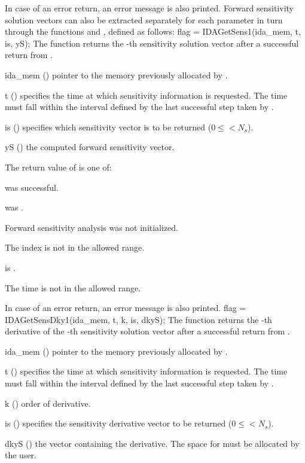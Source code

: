 {
  In case of an error return, an error message is also printed.  
}
Forward sensitivity solution vectors can also be extracted separately for 
each parameter in turn through the functions  and
, defined as follows:
{
  flag = IDAGetSens1(ida\_mem, t, is, yS);
}
{
  The function  returns the -th sensitivity solution vector
  after a successful return from .
}
{
  \begin{args}
  \item[ida\_mem] ()
    pointer to the memory previously allocated by .
  \item[t] ()
    specifies the time at which sensitivity information is 
    requested. The time  must fall within the interval defined by the last 
    successful step taken by {\idas}.
  \item[is] () specifies which sensitivity vector is to be returned
    ($0\le$$< N_s$).
  \item[yS] ()
    the computed forward sensitivity vector.
  \end{args}
}
{
  The return value  of  is one of:
  \begin{args}
  \item[\Id{IDA\_SUCCESS}]
     was successful.
  \item[\Id{IDA\_MEM\_NULL}] 
     was .
  \item[\Id{IDA\_NO\_SENS}] 
    Forward sensitivity analysis was not initialized.
  \item[\Id{IDA\_BAD\_IS}]
    The index  is not in the allowed range.
  \item[\Id{IDA\_BAD\_DKY}] 
     is .
  \item[\Id{IDA\_BAD\_T}] 
    The time  is not in the allowed range.
  \end{args}
}
{
  In case of an error return, an error message is also printed.  
}
{
  flag = IDAGetSensDky1(ida\_mem, t, k, is, dkyS);
}
{
  The function  returns the -th derivative of the 
  -th sensitivity solution vector after a successful return from .
}
{
  \begin{args}
  \item[ida\_mem] ()
    pointer to the memory previously allocated by .
  \item[t] ()
    specifies the time at which sensitivity information is 
    requested. The time  must fall within the interval defined by the last 
    successful step taken by {\idas}.
  \item[k] () order of derivative.
  \item[is] () specifies the sensitivity derivative vector to be returned
    ($0\le$$< N_s$).
  \item[dkyS] ()
    the vector containing the derivative. The space for  must be allocated by 
    the user. 
  \end{args}
}
